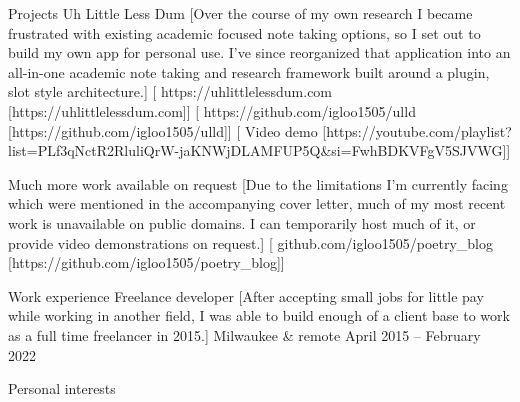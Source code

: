 \documentclass[compact]{llresume}
\begin{document}
\makeheader

\begin{mainpane}

    \begin{mainsection}{Projects}
        \entryGeneric
            {Uh Little Less Dum}
            [Over the course of my own research I became frustrated with existing academic focused note taking options, so I set out to build my own app for personal use. I've since reorganized that application into an all-in-one academic note taking and research framework built around a plugin, slot style architecture.]
            [\infoHomepage
            {https://uhlittlelessdum.com}
            [https://uhlittlelessdum.com]]
            [\infoGithub
                {https://github.com/igloo1505/ulld}
                [https://github.com/igloo1505/ulld]]
            [\infoLink
            {Video demo}
            [https://youtube.com/playlist?list=PLf3qNctR2RluliQrW-jaKNWjDLAMFUP5Q&si=FwhBDKVFgV5SJVWG]]

        \entryGeneric
            {Much more work available on request}
            [Due to the limitations I'm currently facing which were mentioned in the accompanying cover letter, much of my most recent work is unavailable on public domains. I can temporarily host much of it, or provide video demonstrations on request.]
            [\infoGithub
                {github.com/igloo1505/poetry\_blog}
                [https://github.com/igloo1505/poetry_blog]]
    \end{mainsection}

    \begin{mainsection}{Work experience}
        \entryJob
            {Freelance developer}
            [After accepting small jobs for little pay while working in another field, I was able to build enough of a client base to work as a full time freelancer in 2015.]
            {Milwaukee \& remote}
            {April 2015 -- February 2022}
    \end{mainsection}

    \begin{mainsection}{Personal interests}
    \end{mainsection}


\end{mainpane}
\end{document}
